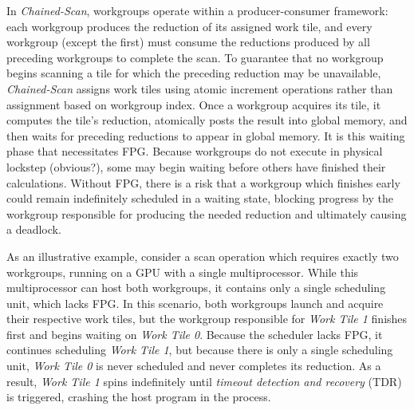 \documentclass[sigconf]{acmart}
\begin{document}
 In \emph{Chained-Scan}, workgroups operate within a producer-consumer framework: each workgroup produces the reduction of its assigned work tile, and every workgroup (except the first) must consume the reductions produced by all preceding workgroups to complete the scan. To guarantee that no workgroup begins scanning a tile for which the preceding reduction may be unavailable, \emph{Chained-Scan} assigns work tiles using atomic increment operations rather than assignment based on workgroup index. Once a workgroup acquires its tile, it computes the tile’s reduction, atomically posts the result into global memory, and then waits for preceding reductions to appear in global memory. It is this waiting phase that necessitates FPG. Because workgroups do not execute in physical lockstep (obvious?), some may begin waiting before others have finished their calculations. Without FPG, there is a risk that a workgroup which finishes early could remain indefinitely scheduled in a waiting state, blocking progress by the workgroup responsible for producing the needed reduction and ultimately causing a deadlock. 
 
 As an illustrative example, consider a scan operation which requires exactly two workgroups, running on a GPU with a single multiprocessor. While this multiprocessor can host both workgroups, it contains only a single scheduling unit, which lacks FPG. In this scenario, both workgroups launch and acquire their respective work tiles, but the workgroup responsible for \emph{Work Tile 1} finishes first and begins waiting on \emph{Work Tile 0}. Because the scheduler lacks FPG, it continues scheduling \emph{Work Tile 1}, but because there is only a single scheduling unit, \emph{Work Tile 0} is never scheduled and never completes its reduction. As a result, \emph{Work Tile 1} spins indefinitely until \emph{timeout detection and recovery} (TDR) is triggered, crashing the host program in the process.
\end{document}
